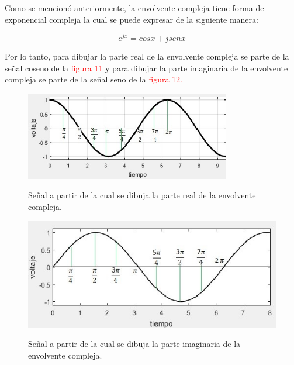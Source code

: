 \begin{itemize}
Como se mencion\'o anteriormente, la envolvente compleja tiene forma de exponencial compleja la cual se puede expresar de la siguiente manera:

\begin{equation}  \label{capdos_cuarentaycinco}
e^{jx} = cos x +j sen x 
\end{equation}

Por lo tanto, para dibujar la parte real de la envolvente compleja se parte de la se\~nal coseno de la \textcolor{Red}{figura 11}  y para dibujar la parte imaginaria de la envolvente compleja se parte de la se\~nal seno de la \textcolor{Red}{figura 12.} 
 
\begin{figure}[h!]
	\captionsetup{justification = raggedright, singlelinecheck = false}
    \caption{Se\~nal a partir de la cual se dibuja la parte real de la envolvente compleja.}
    \centering
    \includegraphics[width=0.8\textwidth]{Imagenes/15.jpeg}
    \label{fig:seno-ejercicio}
\end{figure}

\vspace{200px}
\begin{figure}[h!]
	\captionsetup{justification = raggedright, singlelinecheck = false}
    \caption{Se\~nal a partir de la cual se dibuja la parte imaginaria de la envolvente compleja.}
    \centering
    \includegraphics[width=1\textwidth]{Imagenes/16.jpeg}
    \label{fig:matlab-ejercicio}
\end{figure}


\end{itemize}
